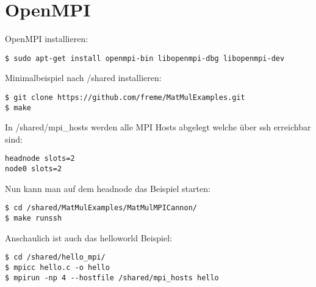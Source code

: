 \chapter{OpenMPI}
OpenMPI installieren:
\begin{lstlisting}[style=Bash]
$ sudo apt-get install openmpi-bin libopenmpi-dbg libopenmpi-dev
\end{lstlisting}
Minimalbeispiel nach /shared installieren:
\begin{lstlisting}[style=Bash]
$ git clone https://github.com/freme/MatMulExamples.git
$ make
\end{lstlisting}
In /shared/mpi\_hosts werden alle MPI Hosts abgelegt welche über ssh erreichbar sind:
\begin{lstlisting}[style=Bash]
headnode slots=2
node0 slots=2
\end{lstlisting}
Nun kann man auf dem headnode das Beispiel starten:
\begin{lstlisting}[style=Bash]
$ cd /shared/MatMulExamples/MatMulMPICannon/
$ make runssh
\end{lstlisting}
Anschaulich ist auch das helloworld Beispiel:
\begin{lstlisting}[style=Bash]
$ cd /shared/hello_mpi/
$ mpicc hello.c -o hello 
$ mpirun -np 4 --hostfile /shared/mpi_hosts hello
\end{lstlisting}
